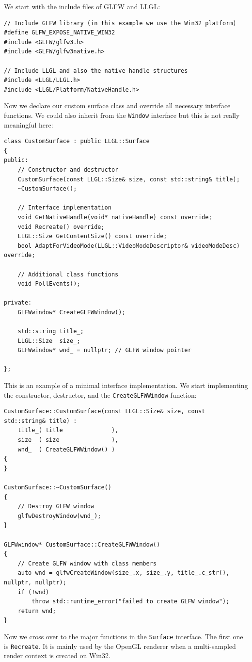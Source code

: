 \documentclass{article}
\begin{document}
We start with the include files of GLFW and LLGL:
\begin{lstlisting}
// Include GLFW library (in this example we use the Win32 platform)
#define GLFW_EXPOSE_NATIVE_WIN32
#include <GLFW/glfw3.h>
#include <GLFW/glfw3native.h>

// Include LLGL and also the native handle structures
#include <LLGL/LLGL.h>
#include <LLGL/Platform/NativeHandle.h>
\end{lstlisting}
Now we declare our custom surface class and override all necessary interface functions.
We could also inherit from the \texttt{Window} interface but this is not really meaningful here:
\begin{lstlisting}
class CustomSurface : public LLGL::Surface
{
public:
	// Constructor and destructor
	CustomSurface(const LLGL::Size& size, const std::string& title);
	~CustomSurface();
	
	// Interface implementation
	void GetNativeHandle(void* nativeHandle) const override;
	void Recreate() override;
	LLGL::Size GetContentSize() const override;
	bool AdaptForVideoMode(LLGL::VideoModeDescriptor& videoModeDesc) override;
	
	// Additional class functions
	void PollEvents();
	
private:
	GLFWwindow* CreateGLFWWindow();
	
	std::string title_;
	LLGL::Size  size_;
	GLFWwindow* wnd_ = nullptr; // GLFW window pointer
	
};
\end{lstlisting}
This is an example of a minimal interface implementation.
We start implementing the constructor, destructor, and the \texttt{CreateGLFWWindow} function:
\begin{lstlisting}
CustomSurface::CustomSurface(const LLGL::Size& size, const std::string& title) :
	title_( title              ),
	size_ ( size               ),
	wnd_  ( CreateGLFWWindow() )
{
}

CustomSurface::~CustomSurface()
{
	// Destroy GLFW window
	glfwDestroyWindow(wnd_);
}

GLFWwindow* CustomSurface::CreateGLFWWindow()
{
	// Create GLFW window with class members
	auto wnd = glfwCreateWindow(size_.x, size_.y, title_.c_str(), nullptr, nullptr);
	if (!wnd)
		throw std::runtime_error("failed to create GLFW window");
	return wnd;
}
\end{lstlisting}
Now we cross over to the major functions in the \texttt{Surface} interface. The first one is \texttt{Recreate}.
It is mainly used by the OpenGL renderer when a multi-sampled render context is created on Win32.
\end{document}
